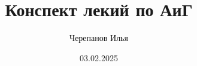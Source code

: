 \documentclass[12pt, fleqn]{article}
\title{Конспект лекий по АиГ}
\date{03.02.2025}
\author{Черепанов Илья}
\begin{document}
	\maketitle
	\clearpage
	\tableofcontents{}
	\clearpage
\end{document}
